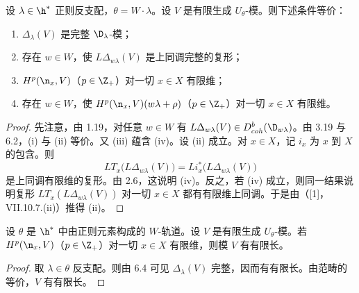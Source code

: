 \begin{proposition}\label{prop:03.6.4}
设 $\lambda\in\h^*$ 正则反支配，$\theta=W\cdot\lambda$。设 $V$ 是有限生成 $U_\theta$-模。则下述条件等价：
\begin{enumerate}[label=(\roman*)]
\item $\Delta_\lambda(V)$ 是完整 $\D_\lambda$-模；
\item 存在 $w\in W$，使 $L\Delta_{w\lambda}(V)$ 是上同调完整的复形；
\item $H^p(\n_x,V)$（$p\in\Z_+$）对一切 $x\in X$ 有限维；
\item 存在 $w\in W$，使 $H^p(\n_x,V)(w\lambda+\rho)$（$p\in\Z_+$）对一切 $x\in X$ 有限维。
\end{enumerate}
\end{proposition}

\begin{proof}
先注意，由 1.19，对任意 $w\in W$ 有 $L\Delta_{w\lambda}(V)\in D^b_{coh}(\D_{w\lambda})$。由 3.19 与 6.2，(i) 与 (ii) 等价。又 (iii) 蕴含 (iv)。设 (ii) 成立。对 $x\in X$，记 $i_x$ 为 $x$ 到 $X$ 的包含。则
$$LT_x\bigl(L\Delta_{w\lambda}(V)\bigr)=Li_x^*\bigl(L\Delta_{w\lambda}(V)\bigr)$$
是上同调有限维的复形。由 2.6，这说明 (iv)。反之，若 (iv) 成立，则同一结果说明复形 $LT_x(L\Delta_{w\lambda}(V))$ 对一切 $x\in X$ 都有有限维上同调。于是由（[1]，VII.10.7.(ii)）推得 (ii)。
\end{proof}

\begin{corollary}\label{cor:03.6.5}
设 $\theta$ 是 $\h^*$ 中由正则元素构成的 $W$-轨道。设 $V$ 是有限生成 $U_\theta$-模。若 $H^p(\n_x,V)$（$p\in\Z_+$）对一切 $x\in X$ 有限维，则模 $V$ 有有限长。
\end{corollary}

\begin{proof}
取 $\lambda\in\theta$ 反支配。则由 6.4 可见 $\Delta_\lambda(V)$ 完整，因而有有限长。由范畴的等价，$V$ 有有限长。
\end{proof}
